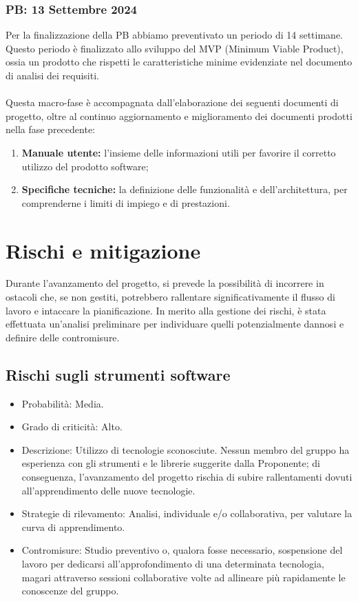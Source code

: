 \subsubsection{PB: 13 Settembre 2024}
Per la finalizzazione della PB abbiamo preventivato un periodo di 14 settimane. Questo periodo è finalizzato allo sviluppo del MVP (Minimum Viable Product), ossia un prodotto che rispetti le caratteristiche minime evidenziate nel documento di analisi dei requisiti. \\
\\
Questa macro-fase è accompagnata dall’elaborazione dei seguenti documenti di progetto, oltre al continuo aggiornamento e miglioramento dei documenti prodotti nella fase precedente:
\begin{enumerate}
  \item \textbf{Manuale utente:} l’insieme delle informazioni utili per favorire il corretto utilizzo del prodotto software;
  \item \textbf{Specifiche tecniche:} la definizione delle funzionalità e dell’architettura, per comprenderne i limiti di impiego e di prestazioni.
\end{enumerate}

\section{Rischi e mitigazione}
Durante l’avanzamento del progetto, si prevede la possibilità di incorrere in ostacoli che, se non gestiti, potrebbero rallentare significativamente il flusso di lavoro e intaccare la pianificazione. In merito alla gestione dei rischi, è stata effettuata un’analisi preliminare per individuare quelli potenzialmente dannosi e definire delle contromisure.

\subsection{Rischi sugli strumenti software}
\begin{itemize}
  \item Probabilità: Media.
  \item Grado di criticità: Alto.
  \item Descrizione: Utilizzo di tecnologie sconosciute. Nessun membro del gruppo ha esperienza con gli strumenti e le librerie suggerite dalla Proponente; di conseguenza, l’avanzamento del progetto rischia di subire rallentamenti dovuti all’apprendimento delle nuove tecnologie.
  \item Strategie di rilevamento: Analisi, individuale e/o collaborativa, per valutare la curva di apprendimento.
  \item Contromisure: Studio preventivo o, qualora fosse necessario, sospensione del lavoro per dedicarsi all’approfondimento di una determinata tecnologia, magari attraverso sessioni collaborative volte ad allineare più rapidamente le conoscenze del gruppo.
\end{itemize}

